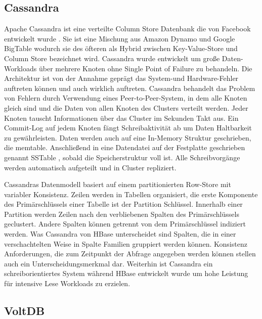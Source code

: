 \subsection{Cassandra} 
Apache Cassandra ist eine verteilte Column Store Datenbank die von Facebook entwickelt wurde \cite{Lakshman:2010:CDS:1773912.1773922}. Sie ist eine Mischung aus Amazon Dynamo und Google BigTable wodurch sie des öfteren als Hybrid zwischen Key-Value-Store und Column Store bezeichnet wird. Cassandra wurde entwickelt um große Daten-Workloads über mehrere Knoten ohne Single Point of Failure zu behandeln. Die Architektur ist von der Annahme geprägt das System-und Hardware-Fehler auftreten können und auch wirklich auftreten. Cassandra behandelt das Problem von Fehlern durch Verwendung eines Peer-to-Peer-System, in dem alle Knoten gleich sind und die Daten von allen Knoten des Clusters verteilt werden. Jeder Knoten tauscht Informationen über das Cluster im Sekunden Takt aus. Ein Commit-Log auf jedem Knoten fängt Schreibaktivität ab um Daten Haltbarkeit zu gewährleisten. Daten werden auch auf eine In-Memory Struktur geschrieben, die memtable. Anschließend in eine Datendatei auf der Festplatte geschrieben genannt SSTable , sobald die Speicherstruktur voll ist. Alle Schreibvorgänge werden automatisch aufgeteilt und in Cluster repliziert. 

Cassandras Datenmodell basiert auf einem partitionierten Row-Store mit variabler Konsistenz. Zeilen werden in Tabellen organisiert, die erste Komponente des Primärschlüssels einer Tabelle ist der Partition Schlüssel. Innerhalb einer Partition werden Zeilen nach den verbliebenen Spalten des Primärschlüssels geclustert. Andere Spalten können getrennt von dem Primärschlüssel indiziert werden. Was Cassandra von HBase unterscheidet sind Spalten, die in einer verschachtelten Weise in Spalte Familien gruppiert werden können. Konsistenz Anforderungen, die zum Zeitpunkt der Abfrage angegeben werden können stellen auch ein Unterscheidungsmerkmal dar. Weiterhin ist Cassandra ein schreiborientiertes System während HBase entwickelt wurde um hohe Leistung für intensive Lese Workloads zu erzielen.

\subsection{VoltDB} 

